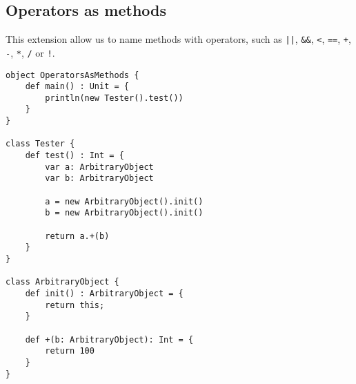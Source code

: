 \subsection{Operators as methods}

This extension allow us to name methods with operators, such as \lstinline$||$, \lstinline$&&$, \lstinline$<$, \lstinline$==$, \lstinline$+$, \lstinline$-$, \lstinline$*$, \lstinline$/$ or \lstinline$!$.

\begin{lstlisting}
object OperatorsAsMethods {
    def main() : Unit = {
        println(new Tester().test())
    }
}

class Tester {
    def test() : Int = {
		var a: ArbitraryObject
		var b: ArbitraryObject

		a = new ArbitraryObject().init()
		b = new ArbitraryObject().init()

		return a.+(b)
    }
}

class ArbitraryObject {
	def init() : ArbitraryObject = {
		return this;
	}

	def +(b: ArbitraryObject): Int = {
		return 100
	}
}
\end{lstlisting}
